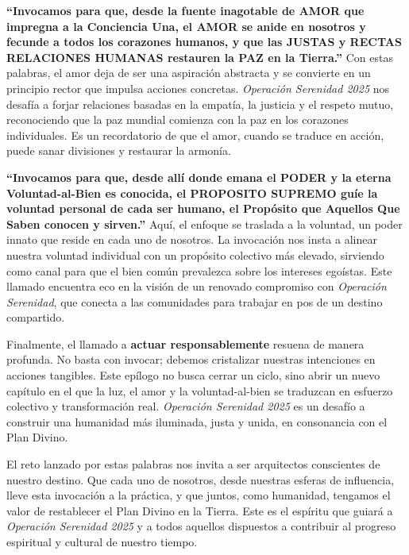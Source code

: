 \documentclass[
]{book}
\begin{document}
\textbf{``Invocamos para que, desde la fuente inagotable de AMOR que impregna a la Conciencia Una, el AMOR se anide en nosotros y fecunde a todos los corazones humanos, y que las JUSTAS y RECTAS RELACIONES HUMANAS restauren la PAZ en la Tierra.''} Con estas palabras, el amor deja de ser una aspiración abstracta y se convierte en un principio rector que impulsa acciones concretas. \emph{Operación Serenidad 2025} nos desafía a forjar relaciones basadas en la empatía, la justicia y el respeto mutuo, reconociendo que la paz mundial comienza con la paz en los corazones individuales. Es un recordatorio de que el amor, cuando se traduce en acción, puede sanar divisiones y restaurar la armonía.

\textbf{``Invocamos para que, desde allí donde emana el PODER y la eterna Voluntad-al-Bien es conocida, el PROPOSITO SUPREMO guíe la voluntad personal de cada ser humano, el Propósito que Aquellos Que Saben conocen y sirven.''} Aquí, el enfoque se traslada a la voluntad, un poder innato que reside en cada uno de nosotros. La invocación nos insta a alinear nuestra voluntad individual con un propósito colectivo más elevado, sirviendo como canal para que el bien común prevalezca sobre los intereses egoístas. Este llamado encuentra eco en la visión de un renovado compromiso con \emph{Operación Serenidad}, que conecta a las comunidades para trabajar en pos de un destino compartido.

Finalmente, el llamado a \textbf{actuar responsablemente} resuena de manera profunda. No basta con invocar; debemos cristalizar nuestras intenciones en acciones tangibles. Este epílogo no busca cerrar un ciclo, sino abrir un nuevo capítulo en el que la luz, el amor y la voluntad-al-bien se traduzcan en esfuerzo colectivo y transformación real. \emph{Operación Serenidad 2025} es un desafío a construir una humanidad más iluminada, justa y unida, en consonancia con el Plan Divino.

El reto lanzado por estas palabras nos invita a ser arquitectos conscientes de nuestro destino. Que cada uno de nosotros, desde nuestras esferas de influencia, lleve esta invocación a la práctica, y que juntos, como humanidad, tengamos el valor de restablecer el Plan Divino en la Tierra. Este es el espíritu que guiará a \emph{Operación Serenidad 2025} y a todos aquellos dispuestos a contribuir al progreso espiritual y cultural de nuestro tiempo.

  
\end{document}
